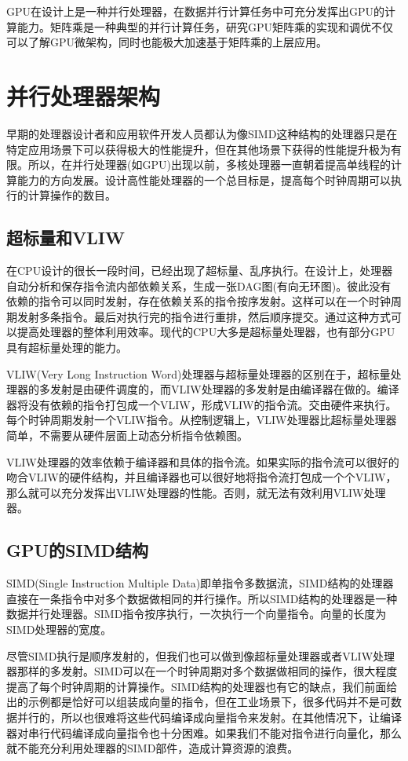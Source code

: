GPU在设计上是一种并行处理器，在数据并行计算任务中可充分发挥出GPU的计算能力。矩阵乘是一种典型的并行计算任务，研究GPU矩阵乘的实现和调优不仅可以了解GPU微架构，同时也能极大加速基于矩阵乘的上层应用。

\section{并行处理器架构}
早期的处理器设计者和应用软件开发人员都认为像SIMD这种结构的处理器只是在特定应用场景下可以获得极大的性能提升，但在其他场景下获得的性能提升极为有限。所以，在并行处理器(如GPU)出现以前，多核处理器一直朝着提高单线程的计算能力的方向发展。设计高性能处理器的一个总目标是，提高每个时钟周期可以执行的计算操作的数目。

\subsection{超标量和VLIW}
在CPU设计的很长一段时间，已经出现了超标量、乱序执行。在设计上，处理器自动分析和保存指令流内部依赖关系，生成一张DAG图(有向无环图)。彼此没有依赖的指令可以同时发射，存在依赖关系的指令按序发射。这样可以在一个时钟周期发射多条指令。最后对执行完的指令进行重排，然后顺序提交。通过这种方式可以提高处理器的整体利用效率。现代的CPU大多是超标量处理器，也有部分GPU具有超标量处理的能力。

VLIW(Very Long Instruction Word)处理器与超标量处理器的区别在于，超标量处理器的多发射是由硬件调度的，而VLIW处理器的多发射是由编译器在做的。编译器将没有依赖的指令打包成一个VLIW，形成VLIW的指令流。交由硬件来执行。每个时钟周期发射一个VLIW指令。从控制逻辑上，VLIW处理器比超标量处理器简单，不需要从硬件层面上动态分析指令依赖图。

VLIW处理器的效率依赖于编译器和具体的指令流。如果实际的指令流可以很好的吻合VLIW的硬件结构，并且编译器也可以很好地将指令流打包成一个个VLIW，那么就可以充分发挥出VLIW处理器的性能。否则，就无法有效利用VLIW处理器。


\subsection{GPU的SIMD结构}
SIMD(Single Instruction Multiple Data)即单指令多数据流，SIMD结构的处理器直接在一条指令中对多个数据做相同的并行操作。所以SIMD结构的处理器是一种数据并行处理器。SIMD指令按序执行，一次执行一个向量指令。向量的长度为SIMD处理器的宽度。

尽管SIMD执行是顺序发射的，但我们也可以做到像超标量处理器或者VLIW处理器那样的多发射。SIMD可以在一个时钟周期对多个数据做相同的操作，很大程度提高了每个时钟周期的计算操作。SIMD结构的处理器也有它的缺点，我们前面给出的示例都是恰好可以组装成向量的指令，但在工业场景下，很多代码并不是可数据并行的，所以也很难将这些代码编译成向量指令来发射。在其他情况下，让编译器对串行代码编译成向量指令也十分困难。如果我们不能对指令进行向量化，那么就不能充分利用处理器的SIMD部件，造成计算资源的浪费。

